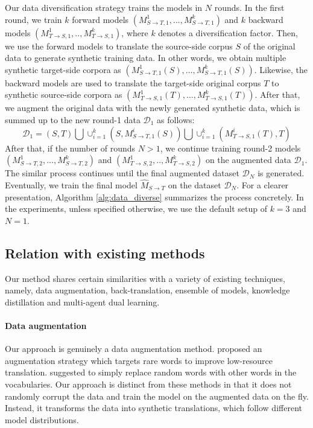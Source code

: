 \documentclass{article}
\def\gD{{\mathcal{D}}}
\begin{document}
Our data diversification strategy trains the models in $N$ rounds. In the first round, we train $k$ forward models $(M^1_{S \rightarrow T,1},...,M^k_{S \rightarrow T,1})$ and $k$ backward models $(M^1_{T \rightarrow S,1},..,M^k_{T \rightarrow S,1})$, where $k$ denotes a diversification factor. 
Then, we use the forward models to translate the source-side corpus $S$ of the original data to generate synthetic training data. In other words, we obtain multiple synthetic target-side corpora as $(M^1_{S \rightarrow T,1}(S),...,M^k_{S \rightarrow T,1}(S))$. Likewise, the backward models are used to translate the target-side original corpus $T$ to synthetic source-side corpora as $(M^1_{T \rightarrow S,1}(T),...,M^k_{T \rightarrow S,1}(T))$.
After that, we augment the original data with the newly generated synthetic data, which is summed up to the new round-1 data $\gD_1$ as follows:
\begin{equation}
    \gD_1 = (S,T) \bigcup \cup_{i=1}^k (S, M^i_{S \rightarrow T,1}(S)) \bigcup \cup_{i=1}^k (M^i_{T \rightarrow S,1}(T), T)
\end{equation}
After that, if the number of rounds $N > 1$, we continue training round-2 models $(M^1_{S \rightarrow T,2},...,M^k_{S \rightarrow T,2})$ and $(M^1_{T \rightarrow S,2},..,M^k_{T \rightarrow S,2})$ on the augmented data $\gD_1$. The similar process continues until the final augmented dataset $\gD_N$ is generated. Eventually, we train the final model $\hat{M}_{S \rightarrow T}$ on the dataset $\gD_N$. For a clearer presentation, Algorithm \ref{alg:data_diverse} summarizes the process concretely. In the experiments, unless specified otherwise, we use the default setup of $k=3$ and $N=1$.

\subsection{Relation with existing methods} \label{subsec:rel}

Our method shares certain similarities with a variety of existing techniques, namely, data augmentation, back-translation, ensemble of models, knowledge distillation and multi-agent dual learning.

\vspace{-0.5em}
\paragraph{Data augmentation} Our approach is genuinely a data augmentation method. \citet{data_aug_low_resource_fadaee-etal-2017-data} proposed an augmentation strategy which targets rare words to improve low-resource translation. \citet{switchout} suggested to simply replace random words with other words in the vocabularies. 
Our approach is distinct from these methods in that it does not randomly corrupt the data and train the model on the augmented data on the fly. 
Instead, it transforms the data into synthetic translations, which follow different model distributions.
\end{document}
